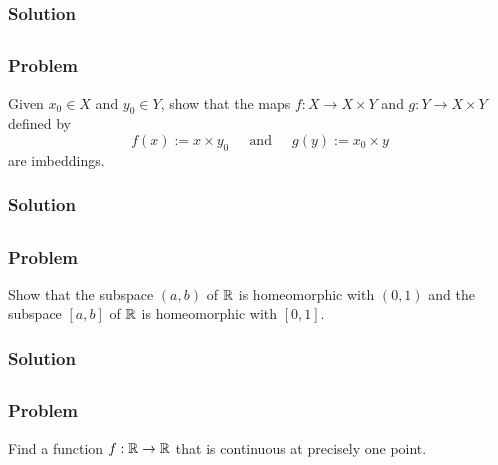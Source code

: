 \subsubsection{Solution}
\todo


\subsection{}

\subsubsection{Problem}
Given $x_0 \in X$ and $y_0 \in Y$, show that the maps $f : X \to X \times Y$ and $g : Y \to X \times Y$ defined by
\[ f(x) := x \times y_0 ~~~~~\mbox{ and }~~~~~ g(y) := x_0 \times y \]
are imbeddings.

\subsubsection{Solution}
\todo


\subsection{}

\subsubsection{Problem}
Show that the subspace $(a, b)$ of $\mathbb R$ is homeomorphic with $(0, 1)$ and the subspace $[a, b]$ of $\mathbb R$ is homeomorphic with $[0, 1]$.

\subsubsection{Solution}
\todo


\setcounter{subsection}{5} %
\subsection{}

\subsubsection{Problem}
Find a function $f : \mathbb R \to \mathbb R$ that is continuous at precisely one point.

